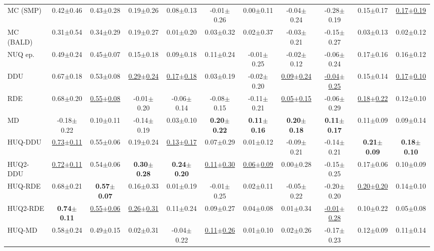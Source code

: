 \begin{table*}[!ht]
{\begin{tabular}{l|c|c|c|c|c|c|c|c|c|c}
MC (SMP) & 0.42$\pm$0.46 & 0.43$\pm$0.28 & 0.19$\pm$0.26 & 0.08$\pm$0.13 & -0.01$\pm$0.26 & 0.00$\pm$0.11 & -0.04$\pm$0.24 & -0.28$\pm$0.19 & 0.15$\pm$0.17 & \underline{0.17$\pm$0.19} \\
MC (BALD) & 0.31$\pm$0.54 & 0.34$\pm$0.29 & 0.19$\pm$0.27 & 0.01$\pm$0.20 & 0.03$\pm$0.32 & 0.02$\pm$0.37 & -0.03$\pm$0.21 & -0.15$\pm$0.27 & 0.03$\pm$0.13 & 0.02$\pm$0.12 \\
NUQ ep. & 0.49$\pm$0.24 & 0.45$\pm$0.07 & 0.15$\pm$0.18 & 0.09$\pm$0.18 & 0.11$\pm$0.24 & -0.01$\pm$0.25 & -0.02$\pm$0.12 & -0.06$\pm$0.24 & 0.17$\pm$0.16 & 0.16$\pm$0.12 \\ \midrule
DDU & 0.67$\pm$0.18 & 0.53$\pm$0.08 & \underline{0.29$\pm$0.24} & \underline{0.17$\pm$0.18} & 0.03$\pm$0.19 & -0.02$\pm$0.20 & \underline{0.09$\pm$0.24} & \underline{-0.04$\pm$0.25} & 0.15$\pm$0.14 & \underline{0.17$\pm$0.10} \\
RDE & 0.68$\pm$0.20 & \underline{0.55$\pm$0.08} & -0.01$\pm$0.20 & -0.06$\pm$0.14 & -0.08$\pm$0.15 & -0.11$\pm$0.21 & \underline{0.05$\pm$0.15} & -0.06$\pm$0.29 & \underline{0.18$\pm$0.22} & 0.12$\pm$0.10 \\
MD & -0.18$\pm$0.22 & 0.10$\pm$0.11 & -0.14$\pm$0.19 & 0.03$\pm$0.10 & \textbf{0.20$\pm$0.22} & \textbf{0.11$\pm$0.16} & \textbf{0.20$\pm$0.18} & \textbf{0.11$\pm$0.17} & 0.11$\pm$0.09 & 0.09$\pm$0.14 \\ \midrule
HUQ-DDU & \underline{0.73$\pm$0.11} & 0.55$\pm$0.06 & 0.19$\pm$0.24 & \underline{0.13$\pm$0.17} & 0.07$\pm$0.29 & 0.01$\pm$0.12 & -0.09$\pm$0.21 & -0.14$\pm$0.21 & \textbf{0.21$\pm$0.09} & \textbf{0.18$\pm$0.10} \\
HUQ2-DDU & \underline{0.72$\pm$0.11} & 0.54$\pm$0.06 & \textbf{0.30$\pm$0.28} & \textbf{0.24$\pm$0.20} & \underline{0.11$\pm$0.30} & \underline{0.06$\pm$0.09} & 0.00$\pm$0.28 & -0.15$\pm$0.25 & 0.17$\pm$0.06 & 0.10$\pm$0.09 \\
HUQ-RDE & 0.68$\pm$0.21 & \textbf{0.57$\pm$0.07} & 0.16$\pm$0.33 & 0.01$\pm$0.19 & -0.01$\pm$0.25 & 0.02$\pm$0.11 & -0.05$\pm$0.22 & -0.20$\pm$0.20 & \underline{0.20$\pm$0.20} & 0.14$\pm$0.10 \\
HUQ2-RDE & \textbf{0.74$\pm$0.11} & \underline{0.55$\pm$0.06} & \underline{0.26$\pm$0.31} & 0.11$\pm$0.24 & 0.09$\pm$0.27 & 0.04$\pm$0.08 & 0.01$\pm$0.34 & \underline{-0.01$\pm$0.28} & 0.10$\pm$0.22 & 0.05$\pm$0.08 \\
HUQ-MD & 0.58$\pm$0.24 & 0.49$\pm$0.15 & 0.02$\pm$0.31 & -0.04$\pm$0.22 & \underline{0.11$\pm$0.26} & 0.01$\pm$0.10 & 0.02$\pm$0.26 & -0.17$\pm$0.23 & 0.12$\pm$0.09 & 0.11$\pm$0.14 \\

\end{tabular}}
\end{table*}
